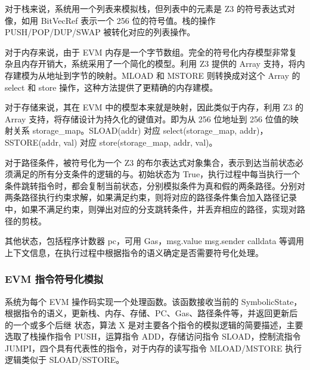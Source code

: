 \documentclass[print, master, vlined, timesmath]{DissertUESTC}
\begin{document}
对于栈来说，系统用一个列表来模拟栈，但列表中的元素是 Z3 的符号表达式对像，如用 BitVecRef 表示一个 256 位的符号值。栈的操作 PUSH/POP/DUP/SWAP 被转化对应的列表操作。

对于内存来说，由于 EVM 内存是一个字节数组。完全的符号化内存模型非常复杂且内存开销大，系统采用了一个简化的模型。利用 Z3 提供的 Array 支持，将内存建模为从地址到字节的映射。MLOAD 和 MSTORE 则转换成对这个 Array 的 select 和 store 操作，这种方法提供了更精确的内存建模。

对于存储来说，其在 EVM 中的模型本来就是映射，因此类似于内存，利用 Z3 的 Array 支持，将存储设计为持久化的键值对。即为从 256 位地址到 256 位值的映射关系 storage\_map。SLOAD(addr) 对应 select(storage\_map, addr)，SSTORE(addr, val) 对应 store(storage\_map, addr, val)。

对于路径条件，被符号化为一个 Z3 的布尔表达式对象集合，表示到达当前状态必须满足的所有分支条件的逻辑的与。初始状态为 True，执行过程中每当执行一个条件跳转指令时，都会复制当前状态，分别模拟条件为真和假的两条路径。分别对两条路径执行约束求解，如果满足约束，则将对应的路径条件集合加入路径记录中，如果不满足约束，则弹出对应的分支跳转条件，并丢弃相应的路径，实现对路径的剪枝。

其他状态，包括程序计数器 pc，可用 Gas，msg.value msg.sender calldata 等调用上下文信息，在执行过程中根据指令的语义确定是否需要符号化处理。

\subsubsection{EVM 指令符号化模拟}
系统为每个 EVM 操作码实现一个处理函数。该函数接收当前的 SymbolicState，根据指令的语义，更新栈、内存、存储、PC、Gas、路径条件等，并返回更新后的一个或多个后继
状态，算法 X 是对主要各个指令的模拟逻辑的简要描述，主要选取了栈操作指令 PUSH，运算指令 ADD，存储访问指令 SLOAD，控制流指令 JUMPI，四个具有代表性的指令，对于内存的读写指令 MLOAD/MSTORE 执行逻辑类似于 SLOAD/SSTORE。
\end{document}
